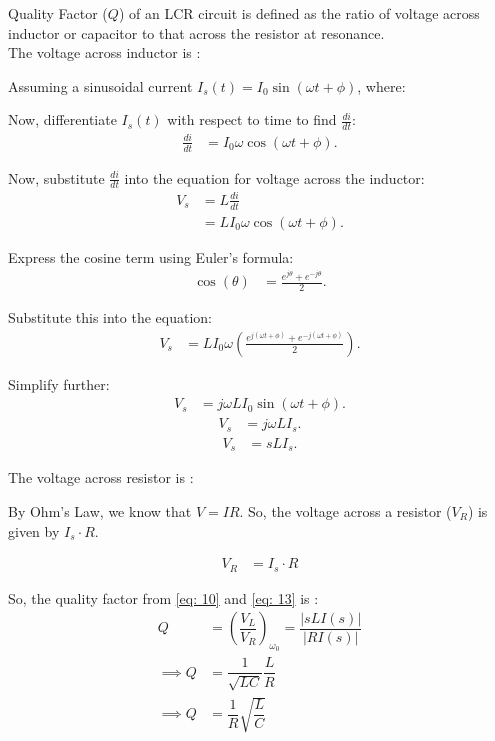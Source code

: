 \documentclass[journal,12pt,twocolumn]{IEEEtran}
\theoremstyle{remark}
\begin{document}
Quality Factor ($Q$) of an LCR circuit is defined as the ratio of voltage across inductor or capacitor to that across the resistor at resonance.\\

The voltage across inductor is : 

Assuming a sinusoidal current $I_s(t) = I_0 \sin(\omega t + \phi)$, where:

Now, differentiate $I_s(t)$ with respect to time to find $\frac{di}{dt}$:
\begin{align}
    \frac{di}{dt} & = I_0 \omega \cos(\omega t + \phi).
\end{align}

Now, substitute $\frac{di}{dt}$ into the equation for voltage across the inductor:
\begin{align}
    V_s & = L \frac{di}{dt} \\
    & = L I_0 \omega \cos(\omega t + \phi).
\end{align}

Express the cosine term using Euler's formula:
\begin{align}
    \cos(\theta) & = \frac{e^{j\theta} + e^{-j\theta}}{2}.
\end{align}

Substitute this into the equation:
\begin{align}
    V_s & = L I_0 \omega \left(\frac{e^{j(\omega t + \phi)} + e^{-j(\omega t + \phi)}}{2}\right).
\end{align}

Simplify further:
\begin{align}
    V_s & = j\omega L I_0 \sin(\omega t + \phi).
\end{align}
\begin{align}
    V_s & = j\omega L I_s.
\end{align}
\begin{align}
    V_s & = s L I_s.\label{eq: 10}
\end{align}

The voltage across resistor is :

By Ohm's Law, we know that \(V = IR\). So, the voltage across a resistor (\(V_R\)) is given by \(I_s \cdot R\).

\begin{align}
    V_R & = I_s \cdot R\label{eq: 13}
\end{align}

So, the quality factor from \eqref{eq: 10} and \eqref{eq: 13} is : 
\begin{align}
    Q &= \left(\dfrac{V_L}{V_R}\right)_{\omega_0} = \dfrac{\lvert{sLI(s)}\rvert}{\lvert RI(s) \rvert}\\
    \implies Q &= \dfrac{1}{\sqrt{LC}}\dfrac{L}{R}\\
    \implies Q &= \dfrac{1}{R}\sqrt{\dfrac{L}{C}}\label{eq: 9}
\end{align}
\end{document}
